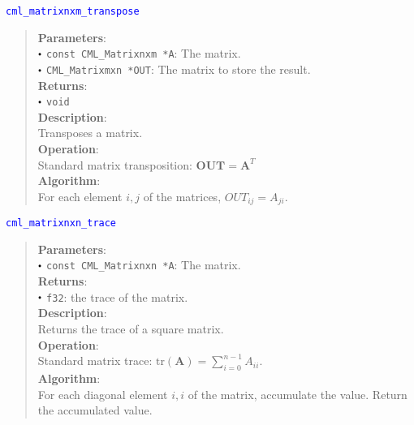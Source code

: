\documentclass[a4paper,oneside,8pt]{extarticle}
\newcommand{\function}[1]{
  \noindent\textcolor{blue}{\texttt{#1}}
  \vspace{-0.3em}
}
\renewcommand{\dot}{\raisebox{0.3ex}{\scalebox{0.6}{$\bullet$}}}
\theoremstyle{definition}
\begin{document}
\function{cml\_matrixnxm\_transpose}
\begin{quote}
  \textbf{Parameters}: \\
  $\dot$ \texttt{const CML\_Matrixnxm *A}: The matrix. \\
  $\dot$ \texttt{CML\_Matrixmxn *OUT}: The matrix to store the result. \\
  \textbf{Returns}: \\
  $\dot$ \texttt{void} \\

  \vspace{-0.75em}
  \textbf{Description}: \\
  Transposes a matrix. \\

  \vspace{-0.75em}
  \textbf{Operation}: \\
  Standard matrix transposition: $\mathbf{OUT} = \mathbf{A}^T$ \\

  \vspace{-0.75em}
  \textbf{Algorithm}: \\
  For each element $i, j$ of the matrices, $OUT_{ij} = A_{ji}$. \\
\end{quote}

\function{cml\_matrixnxn\_trace}
\begin{quote}
  \textbf{Parameters}: \\
  $\dot$ \texttt{const CML\_Matrixnxn *A}: The matrix. \\
  \textbf{Returns}: \\
  $\dot$ \texttt{f32}: the trace of the matrix. \\

  \vspace{-0.75em}
  \textbf{Description}: \\
  Returns the trace of a square matrix. \\

  \vspace{-0.75em}
  \textbf{Operation}: \\
  Standard matrix trace: $\mathrm{tr}(\mathbf{A}) = \sum_{i=0}^{n-1} A_{ii}$. \\

  \vspace{-0.75em}
  \textbf{Algorithm}: \\
  For each diagonal element $i, i$ of the matrix, accumulate the value. Return the accumulated value. \\
\end{quote}
\end{document}
